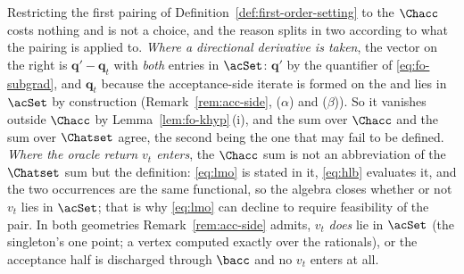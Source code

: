 
\begin{remark}\label{rem:pairing-on-acceptance-support}
Restricting the first pairing of Definition~\ref{def:first-order-setting}
to the  $\Chacc$ costs nothing and is not a
choice, and the reason splits in two according to what the pairing is
applied to. \emph{Where a directional derivative is taken}, the vector on
the right is $\mathbf q'-\mathbf q_t$ with \emph{both} entries in
$\acSet$: $\mathbf q'$ by the quantifier of \eqref{eq:fo-subgrad}, and
$\mathbf q_t$ because the acceptance-side iterate is formed on the
 and lies in $\acSet$ by construction
(Remark~\ref{rem:acc-side}, ($\alpha$) and ($\beta$)). So it vanishes
outside $\Chacc$ by Lemma~\ref{lem:fo-khyp}\,(i), and the sum over
$\Chacc$ and the sum over $\Chatset$ agree, the second being the one that
may fail to be defined. \emph{Where the oracle return $v_t$ enters}, the
$\Chacc$ sum is not an abbreviation of the $\Chatset$ sum but the
definition: \eqref{eq:lmo} is stated in it, \eqref{eq:hlb} evaluates it,
and the two occurrences are the same functional, so the algebra closes
whether or not $v_t$ lies in $\acSet$; that is why \eqref{eq:lmo} can
decline to require feasibility of the pair. In both geometries Remark~\ref{rem:acc-side} admits, $v_t$
\emph{does} lie in $\acSet$ (the singleton's one point; a vertex computed
exactly over the rationals), or the acceptance half is discharged through
$\bacc$ and no $v_t$ enters at all.
\end{remark}
